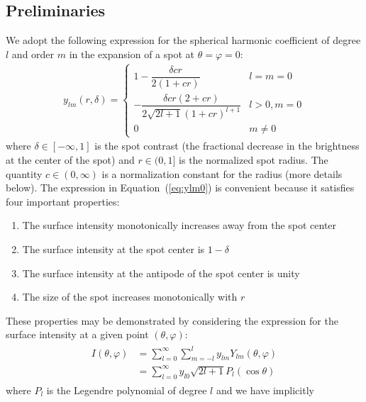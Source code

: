 \documentclass[modern]{aastex62}
\begin{document}
\subsection{Preliminaries}
%
We adopt the following expression for the spherical harmonic coefficient
of degree $l$ and order $m$ in the expansion of a spot at
$\theta = \varphi = 0$:
%
\begin{align}
    \label{eq:ylm0}
    y_{lm}(r, \delta) =
    \begin{cases}
        1 - \dfrac{\delta c r}{2 (1 + c r)}
         & l = m = 0    \\[2em]
        -\dfrac{\delta c r \left( 2 + c r \right)}
        {2 \sqrt{2l + 1} (1 + c r)^{l + 1}}
         & l > 0, m = 0 \\[2em]
        0
         & m \ne 0
    \end{cases}
\end{align}
%
where $\delta \in [-\infty, 1]$ is the spot contrast (the fractional
decrease in the brightness
at the center of the spot) and $r \in (0, 1]$ is the normalized spot radius.
The quantity $c \in (0, \infty)$ is a normalization constant for the radius
(more details below).
The expression in Equation~(\ref{eq:ylm0}) is convenient because it satisfies
four important properties:
%
\begin{enumerate}[itemsep=2pt,parsep=1pt,label=\textbf{\arabic*}]
    \item The surface intensity monotonically increases away from the spot center
    \item The surface intensity at the spot center is $1 - \delta$
    \item The surface intensity at the antipode of the spot center is unity
    \item The size of the spot increases monotonically with $r$
\end{enumerate}
%
These properties may be demonstrated by considering the expression for the
surface intensity at a given point $(\theta, \varphi)$:
%
\begin{align}
    \begin{split}
        I(\theta, \varphi)
        & =
        \sum\limits_{l=0}^\infty \sum\limits_{m=-l}^l
        y_{lm} Y_{lm}(\theta, \varphi) \\
        & = \sum\limits_{l=0}^\infty
        y_{l0} \sqrt{2l + 1} P_l(\cos\theta)
    \end{split}
\end{align}
%
where $P_l$ is the Legendre polynomial of degree $l$ and we have implicitly
\end{document}
